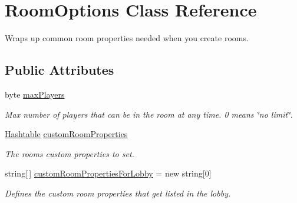 \hypertarget{class_room_options}{}\section{Room\+Options Class Reference}
\label{class_room_options}


Wraps up common room properties needed when you create rooms.  


\subsection*{Public Attributes}
\begin{DoxyCompactItemize}
\item 
byte \hyperlink{class_room_options_aa6e8ee62ea58621a6ac3dc33deb319ba}{max\+Players}
\begin{DoxyCompactList}\small\item\em Max number of players that can be in the room at any time. 0 means \char`\"{}no limit\char`\"{}.\end{DoxyCompactList}\item 
\hyperlink{_extensions_8cs_afa613ef589c02dbd94acc273b62cdcfd}{Hashtable} \hyperlink{class_room_options_a0bc17f8465ed615ce0126674af329a1f}{custom\+Room\+Properties}
\begin{DoxyCompactList}\small\item\em The room\textquotesingle{}s custom properties to set. \end{DoxyCompactList}\item 
string\mbox{[}$\,$\mbox{]} \hyperlink{class_room_options_a8c4bca19c674840296f924ec701b9ee1}{custom\+Room\+Properties\+For\+Lobby} = new string\mbox{[}0\mbox{]}
\begin{DoxyCompactList}\small\item\em Defines the custom room properties that get listed in the lobby. \end{DoxyCompactList}\end{DoxyCompactItemize}
